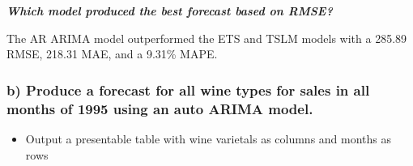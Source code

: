\documentclass[
  letterpaper,
  DIV=11,
  numbers=noendperiod]{scrartcl}
\providecommand{\tightlist}{%
  \setlength{\itemsep}{0pt}\setlength{\parskip}{0pt}}
\begin{document}
\textbf{\emph{Which model produced the best forecast based on RMSE?}}

The AR ARIMA model outperformed the ETS and TSLM models with a 285.89
RMSE, 218.31 MAE, and a 9.31\% MAPE.

\newpage

\subsubsection{b) Produce a forecast for all wine types for sales in all
months of 1995 using an auto ARIMA
model.}\label{b-produce-a-forecast-for-all-wine-types-for-sales-in-all-months-of-1995-using-an-auto-arima-model.}

\begin{itemize}
\tightlist
\item
  Output a presentable table with wine varietals as columns and months
  as rows
\end{itemize}
\end{document}

